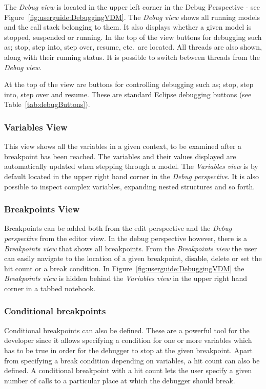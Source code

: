 \documentclass{overturerepsec}
\begin{document}
The \emph{Debug view} is located in the upper left corner in the Debug Perspective -
see Figure~\ref{fig:userguide:DebuggingVDM}. The \emph{Debug view} shows all running
models and the call stack belonging to them. It also displays whether a given model is
stopped, suspended or running. In the top of the view buttons
for debugging such as; stop, step into, step over, resume, etc.\ are located.
All threads are also shown, along with their running status. It is possible to
switch between threads from the \emph{Debug view}.

At the top of the view are buttons for controlling debugging such as; stop, step
into, step over and resume. These are standard Eclipse debugging
buttons (see Table~\ref{tab:debugButtons}).

\subsubsection{Variables View}
 
This view shows all the variables in a given context, to be examined after a breakpoint has been
reached. The variables and their values displayed are automatically updated when
stepping through a model. The \emph{Variables view} is by default located in the upper
right hand corner in the \emph{Debug perspective}. It is also possible to inspect complex variables,
expanding nested structures and so forth.

\subsubsection{Breakpoints View}

Breakpoints can be added both from the edit perspective and the \emph{Debug perspective}
from the editor view. In the debug perspective however, there is a \emph{Breakpoints
view} that shows all breakpoints. From the \emph{Breakpoints view} the user can easily
navigate to the location of a given breakpoint, disable, delete or set the hit
count or a break condition. In Figure~\ref{fig:userguide:DebuggingVDM} the
\emph{Breakpoints view} is hidden behind the \emph{Variables view} in the upper right hand 
corner in a tabbed notebook. 

\subsubsection{Conditional breakpoints}
\label{sec:userguide:breakpoints}

Conditional breakpoints can also be defined. These are a powerful tool for the
developer since it allows specifying a condition for one or more variables which
has to be true in order for the debugger to stop at the given breakpoint. Apart
from specifying a break condition depending on variables, a hit count can also be
defined. A conditional breakpoint with a hit count lets the user specify a given
number of calls to a particular place at which the debugger should break.
\end{document}
